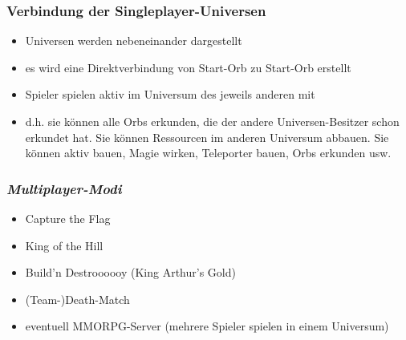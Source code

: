 \subsubsection{Verbindung der Singleplayer-Universen}
\label{subsubsec:verbindung_der_singleplayer_universen}
	\begin{itemize}
		\item Universen werden nebeneinander dargestellt
		\item es wird eine Direktverbindung von Start-Orb zu Start-Orb erstellt
		\item Spieler spielen aktiv im Universum des jeweils anderen mit
		\item d.h. sie können alle Orbs erkunden, die der andere Universen-Besitzer schon erkundet hat. Sie können Ressourcen im anderen Universum abbauen. Sie können aktiv bauen, Magie wirken, Teleporter bauen, Orbs erkunden usw.
	\end{itemize}

\subsubsection{\textit{Multiplayer-Modi}}
\label{subsubsec:multiplayer_modi}
	\begin{itemize}
		\item Capture the Flag
		\item King of the Hill
		\item Build'n Destroooooy (King Arthur's Gold)
		\item (Team-)Death-Match
		\item eventuell MMORPG-Server (mehrere Spieler spielen in einem Universum)
	\end{itemize}



